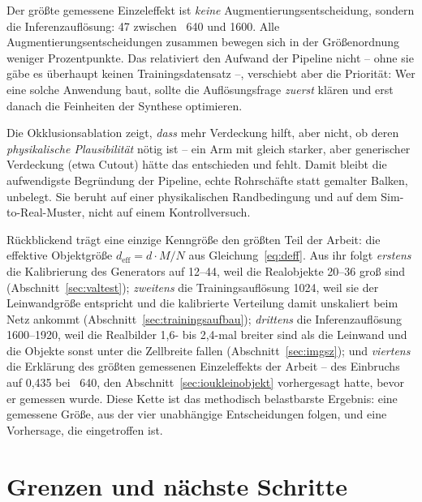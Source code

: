  Der größte gemessene Einzeleffekt ist \emph{keine}
Augmentierungsentscheidung, sondern die Inferenzauflösung: 47\PP{} \mAPfifty{}
zwischen ~640 und 1600. Alle Augmentierungsentscheidungen zusammen
bewegen sich in der Größenordnung weniger Prozentpunkte. Das relativiert den
Aufwand der Pipeline nicht -- ohne sie gäbe es überhaupt keinen
Trainingsdatensatz --, verschiebt aber die Priorität: Wer eine solche Anwendung
baut, sollte die Auflösungsfrage \emph{zuerst} klären und erst danach die
Feinheiten der Synthese optimieren.

 Die Okklusionsablation zeigt,
\emph{dass} mehr Verdeckung hilft, aber nicht, ob deren \emph{physikalische
Plausibilität} nötig ist -- ein Arm mit gleich starker, aber generischer
Verdeckung (etwa Cutout) hätte das entschieden und fehlt. Damit bleibt die
aufwendigste Begründung der Pipeline, echte Rohrschäfte statt gemalter Balken,
unbelegt. Sie beruht auf einer physikalischen Randbedingung und auf dem
Sim-to-Real-Muster, nicht auf einem Kontrollversuch.

 Rückblickend trägt eine
einzige Kenngröße den größten Teil der Arbeit: die effektive Objektgröße
$d_{\text{eff}} = d \cdot M/N$ aus Gleichung~\eqref{eq:deff}. Aus ihr folgt
\emph{erstens} die Kalibrierung des Generators auf 12--44\px, weil die
Realobjekte 20--36\px{} groß sind (Abschnitt~\ref{sec:valtest});
\emph{zweitens} die Trainingsauflösung 1024, weil sie der Leinwandgröße
entspricht und die kalibrierte Verteilung damit unskaliert beim Netz ankommt
(Abschnitt~\ref{sec:trainingsaufbau}); \emph{drittens} die Inferenzauflösung
1600--1920, weil die Realbilder 1,6- bis 2,4-mal breiter sind als die Leinwand
und die Objekte sonst unter die Zellbreite fallen (Abschnitt~\ref{sec:imgsz});
und \emph{viertens} die Erklärung des größten gemessenen Einzeleffekts der
Arbeit -- des Einbruchs auf \mAPfifty{} 0,435 bei ~640, den
Abschnitt~\ref{sec:ioukleinobjekt} vorhergesagt hatte, bevor er gemessen wurde.
Diese Kette ist das methodisch belastbarste Ergebnis: eine gemessene Größe, aus
der vier unabhängige Entscheidungen folgen, und eine Vorhersage, die eingetroffen
ist.

\section{Grenzen und nächste Schritte}
\label{sec:grenzen}

